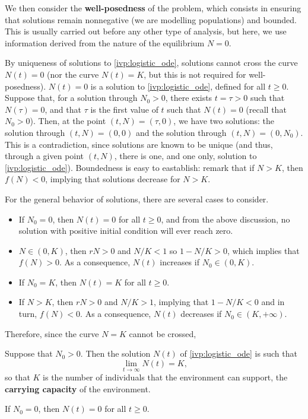 We then consider the \textbf{well-posedness} of the problem, which consists in ensuring that solutions remain nonnegative (we are modelling populations) and bounded. This is usually carried out before any other type of analysis, but here, we use information derived from the nature of the equilibrium $N=0$.

By uniqueness of solutions to \eqref{ivp:logistic_ode}, solutions cannot cross the curve $N(t)=0$ (nor the curve $N(t)=K$, but this is not required for well-posedness). $N(t)=0$ is a solution to \eqref{ivp:logistic_ode}, defined for all $t\geq 0$. Suppose that, for a solution through $N_0>0$, there exists $t=\tau>0$ such that $N(\tau)=0$, and that $\tau$ is the first value of $t$ such that $N(t)=0$ (recall that $N_0>0$). Then, at the point $(t,N)=(\tau,0)$, we have two solutions: the solution through $(t,N)=(0,0)$ and the solution through $(t,N)=(0,N_0)$. This is a contradiction, since solutions are known to be unique (and thus, through a given point $(t,N)$, there is one, and one only, solution to \eqref{ivp:logistic_ode}).
Boundedness is easy to eastablish: remark that if $N>K$, then $f(N)<0$, implying that solutions decrease for $N>K$.


For the general behavior of solutions, there are several cases to consider.
\begin{itemize}
\item If $N_0=0$, then $N(t)=0$ for all $t\geq 0$, and from the above discussion, no solution with positive initial condition will ever reach zero.
\item $N\in(0,K)$, then $rN>0$ and $N/K<1$ so $1-N/K>0$, which implies that $f(N)>0$. As a consequence, $N(t)$ increases if $N_0\in(0,K)$.
\item If $N_0=K$, then $N(t)=K$ for all $t\geq 0$.
\item If $N>K$, then $rN>0$ and $N/K>1$, implying that $1-N/K<0$ and in turn, $f(N)<0$. As a consequence, $N(t)$ decreases if $N_0\in(K,+\infty)$.
\end{itemize}
Therefore, since the curve $N=K$ cannot be crossed, 
\begin{theorem}
Suppose that $N_0>0$. Then the solution $N(t)$ of \eqref{ivp:logistic_ode} is such that
\[
\lim_{t\to\infty} N(t)=K,
\]
so that $K$ is the number of individuals that the environment can support, the \textbf{carrying capacity} of the environment.

If $N_0=0$, then $N(t)=0$ for all $t\geq 0$.
\end{theorem}


